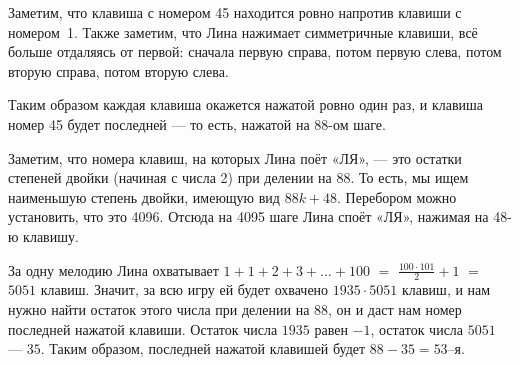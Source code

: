\begin{itemize}

\itA Заметим, что клавиша с номером 45 находится ровно напротив клавиши с номером~1. Также заметим, что Лина нажимает симметричные клавиши, всё больше отдаляясь от первой: сначала первую справа, потом первую слева, потом вторую справа, потом вторую слева.

Таким образом каждая клавиша окажется нажатой ровно один раз, и клавиша номер 45 будет последней — то есть, нажатой на 88-ом шаге.

\itB Заметим, что номера клавиш, на которых Лина поёт «ЛЯ», — это остатки степеней двойки (начиная с числа 2) при делении на 88. То есть, мы ищем наименьшую степень двойки, имеющую вид $88k+48$. Перебором можно установить, что это 4096. Отсюда на 4095 шаге Лина споёт «ЛЯ», нажимая на 48-ю клавишу.

\itC За одну мелодию Лина охватывает $1+1+2+3+\ldots+100$ $=$ $\frac{100 \cdot 101}{2} + 1$ $=$ $5051$ клавиш. Значит, за всю игру ей будет охвачено $1935 \cdot 5051$ клавиш, и нам нужно найти остаток этого числа при делении на 88, он и даст нам номер последней нажатой клавиши. Остаток числа $1935$ равен $-1$, остаток числа $5051$ — $35$. Таким образом, последней нажатой клавишей будет $88-35=53$--я.
\end{itemize}